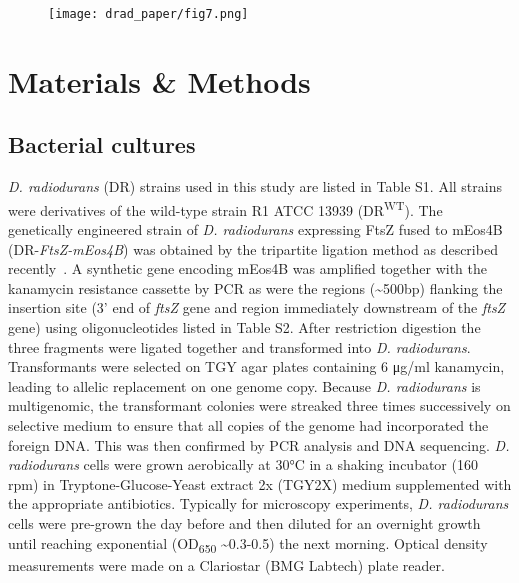 \begin{figure}
    \centering
    \texttt{[image: drad\_paper/fig7.png]}
    \label{drad_fig7}
\end{figure}

\section{Materials \& Methods}

\subsection{Bacterial cultures}

\textit{D. radiodurans} (DR) strains used in this study are listed in Table S1.
All strains were derivatives of the wild-type strain R1 ATCC 13939 (DR\textsuperscript{WT}).
The genetically engineered strain of \textit{D. radiodurans} expressing FtsZ fused to mEos4B (DR-\textit{FtsZ-mEos4B}) was obtained by the tripartite ligation method as described recently~\cite{vauclareStressinducedNucleoidRemodeling2024}.
A synthetic gene encoding mEos4B was amplified together with the kanamycin resistance cassette by PCR as were the regions (\sim500bp) flanking the insertion site (3' end of \textit{ftsZ} gene and region immediately downstream of the \textit{ftsZ} gene) using oligonucleotides listed in Table S2.
After restriction digestion the three fragments were ligated together and transformed into \textit{D. radiodurans}.
Transformants were selected on TGY agar plates containing 6 μg/ml kanamycin, leading to allelic replacement on one genome copy.
Because \textit{D. radiodurans} is multigenomic, the transformant colonies were streaked three times successively on selective medium to ensure that all copies of the genome had incorporated the foreign DNA.
This was then confirmed by PCR analysis and DNA sequencing.
\textit{D. radiodurans} cells were grown aerobically at 30°C in a shaking incubator (160 rpm) in Tryptone-Glucose-Yeast extract 2x (TGY2X) medium supplemented with the appropriate antibiotics.
Typically for microscopy experiments, \textit{D. radiodurans} cells were pre-grown the day before and then diluted for an overnight growth until reaching exponential (OD\textsubscript{650} \sim0.3-0.5) the next morning.
Optical density measurements were made on a Clariostar (BMG Labtech) plate reader.

